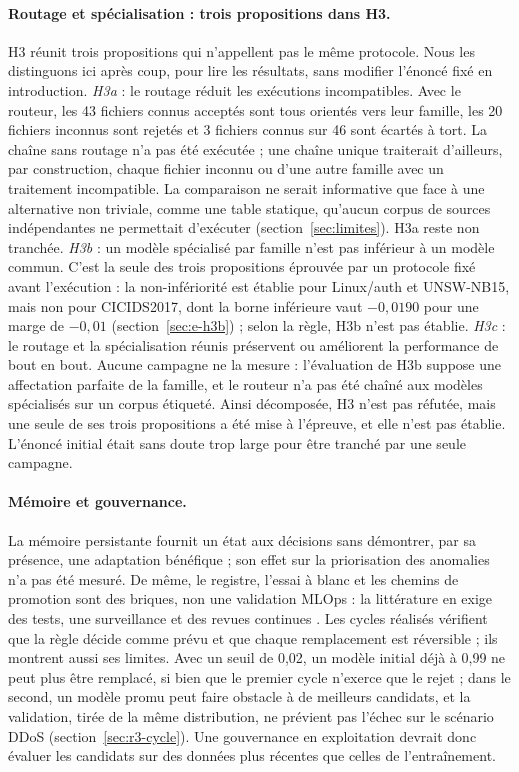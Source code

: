 \paragraph{Routage et spécialisation : trois propositions dans H3.}
H3 réunit trois propositions qui n'appellent pas le même protocole. Nous les distinguons ici
après coup, pour lire les résultats, sans modifier l'énoncé fixé en introduction.
\emph{H3a} : le routage réduit les exécutions incompatibles. Avec le routeur, les 43 fichiers
connus acceptés sont tous orientés vers leur famille, les 20 fichiers inconnus sont rejetés et
3 fichiers connus sur 46 sont écartés à tort. La chaîne sans routage n'a pas été exécutée ;
une chaîne unique traiterait d'ailleurs, par construction, chaque fichier inconnu ou d'une
autre famille avec un traitement incompatible. La comparaison ne serait informative que face
à une alternative non triviale, comme une table statique, qu'aucun corpus de sources
indépendantes ne permettait d'exécuter (section~\ref{sec:limites}). H3a reste non tranchée.
\emph{H3b} : un modèle spécialisé par famille n'est pas inférieur à un modèle commun. C'est la
seule des trois propositions éprouvée par un protocole fixé avant l'exécution : la
non-infériorité est établie pour Linux/auth et UNSW-NB15, mais non pour CICIDS2017, dont la
borne inférieure vaut $-0{,}0190$ pour une marge de $-0{,}01$ (section~\ref{sec:e-h3b}) ;
selon la règle, H3b n'est pas établie. \emph{H3c} : le routage et la spécialisation réunis
préservent ou améliorent la performance de bout en bout. Aucune campagne ne la mesure :
l'évaluation de H3b suppose une affectation parfaite de la famille, et le routeur n'a pas été
chaîné aux modèles spécialisés sur un corpus étiqueté. Ainsi décomposée, H3 n'est pas réfutée,
mais une seule de ses trois propositions a été mise à l'épreuve, et elle n'est pas établie.
L'énoncé initial était sans doute trop large pour être tranché par une seule campagne.

\paragraph{Mémoire et gouvernance.}
La mémoire persistante fournit un état aux décisions sans démontrer, par sa présence, une
adaptation bénéfique ; son effet sur la priorisation des anomalies n'a pas été mesuré. De
même, le registre, l'essai à blanc et les chemins de promotion sont des briques, non une
validation MLOps : la littérature en exige des tests, une surveillance et des revues
continues \cite{sculley2015debt,breck2017mltest,nist2023airmf}. Les cycles réalisés
vérifient que la règle décide comme prévu et que chaque remplacement est réversible ; ils
montrent aussi ses limites. Avec un seuil de 0,02, un modèle initial déjà à 0,99 ne peut
plus être remplacé, si bien que le premier cycle n'exerce que le rejet ; dans le second, un
modèle promu peut faire obstacle à de meilleurs candidats, et la validation, tirée de la
même distribution, ne prévient pas l'échec sur le scénario DDoS
(section~\ref{sec:r3-cycle}). Une gouvernance en exploitation devrait donc évaluer les
candidats sur des données plus récentes que celles de l'entraînement.

